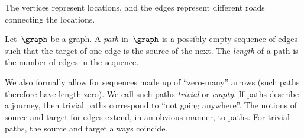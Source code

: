 \begin{marginfigure}
    \caption{\label{fig:graph_road_network}}
\end{marginfigure}
The vertices represent locations, and the edges represent different roads connecting the locations.


\begin{definition}[Paths]
    \label{def:path}
    Let~$\graph$ be a graph.
    A \emph{path} in~$\graph$ is a possibly empty sequence of edges such that the target of one edge is the source of the next.
    The \emph{length} of a path is the number of edges in the sequence.
\end{definition}
We also formally allow for sequences made up of ``zero-many'' arrows (such paths therefore have length zero).
We call such paths \emph{trivial} or \emph{empty}.
If paths describe a journey, then trivial paths correspond to ``not going anywhere''.
The notions of source and target for edges extend, in an obvious manner, to paths.
For trivial paths, the source and target always coincide.
